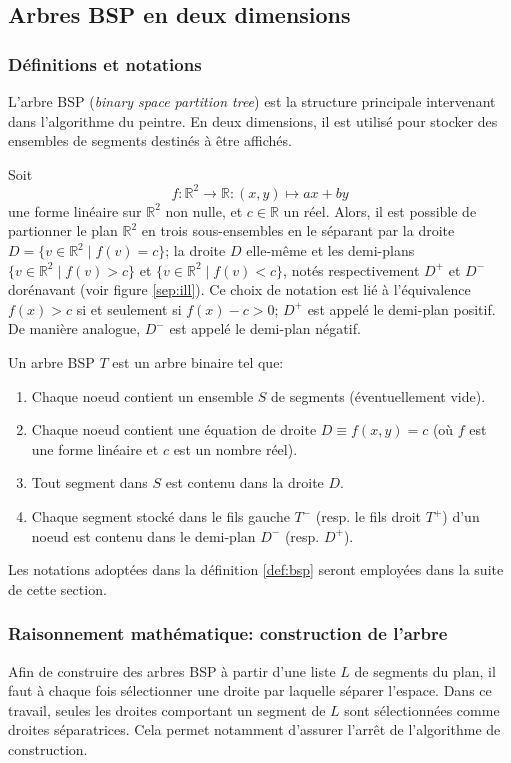 \subsection{Arbres BSP en deux dimensions}
\subsubsection*{Définitions et notations}
L'arbre BSP (\emph{binary space partition tree}) est la structure principale
intervenant dans l'algorithme du peintre. En deux dimensions, il est
utilisé pour stocker des ensembles de segments destinés à être affichés.


Soit
\begin{equation} \label{lin:forme}
f: \mathbb R^2 \to \mathbb R: (x, y)\mapsto ax +by
\end{equation}
une forme linéaire sur $\mathbb R^2$ non nulle, et $c\in\mathbb R$ un réel. Alors, il est possible de
partionner le plan $\mathbb R^2$ en trois sous-ensembles en le séparant
par la droite $D = \{v\in\mathbb R^2\mid f(v) = c\}$;
la droite $D$ elle-même et les demi-plans
$\{v\in\mathbb R^2\mid f(v) > c\}$ et
$\{v\in\mathbb R^2\mid f(v) < c\}$, notés respectivement $D^+$ et $D^-$
dorénavant
(voir figure \ref{sep:ill}). Ce choix de notation est lié à l'équivalence
$f(x)> c$ si et seulement si $f(x)-c>0$; $D^+$ est appelé
le demi-plan positif. De manière analogue, $D^-$ est
appelé le demi-plan négatif.



\begin{df}\label{def:bsp}
  Un arbre BSP $T$ est un arbre binaire tel que:
  \begin{enumerate}
  \item Chaque noeud contient un ensemble $S$ de segments (éventuellement
    vide).
  \item Chaque noeud contient une équation de droite $D\equiv f(x, y) = c$
    (où $f$ est une forme linéaire et $c$ est un nombre réel).
  \item Tout segment dans $S$ est contenu dans la droite $D$.
  \item Chaque segment stocké dans le fils gauche $T^-$ (resp.
    le fils droit $T^+$) d'un noeud est contenu dans le demi-plan
    $D^-$ (resp. $D^+$).
  \end{enumerate}
\end{df}
Les notations adoptées dans la définition \ref{def:bsp} seront employées
dans la suite de cette section.

\subsubsection*{Raisonnement mathématique: construction de l'arbre}
Afin de construire des arbres BSP à partir d'une liste $L$ de segments
du plan, il faut à chaque fois sélectionner une droite par laquelle
séparer l'espace.
Dans ce travail, seules les droites comportant un segment de $L$ sont
sélectionnées comme droites séparatrices. Cela permet notamment d'assurer
l'arrêt de l'algorithme de construction.

